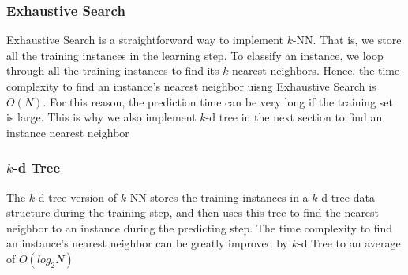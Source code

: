 \subsubsection{Exhaustive Search}
Exhaustive Search is a straightforward way to implement $k$-NN. That is, we store all the training instances in the learning step. To classify an instance, we loop through all the training instances to find its $k$ nearest neighbors. Hence, the time complexity to find an instance's nearest neighbor uisng Exhaustive Search is $O(N)$. For this reason, the prediction time can be very long if the training set is large. This is why we also implement $k$-d tree in the next section to find an instance nearest neighbor

\subsubsection{$k$-d Tree}
The $k$-d tree version of $k$-NN stores the training instances in a $k$-d tree data structure during the training step, and then uses this tree to find the nearest neighbor to an instance during the predicting step. The time complexity to find an instance's nearest neighbor can be greatly improved by $k$-d Tree to an average of $O(log_2N)$